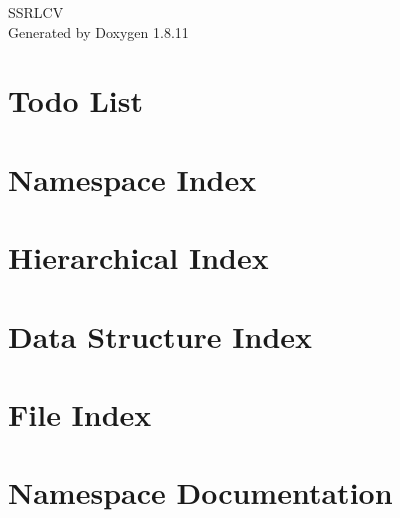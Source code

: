 \documentclass[twoside]{book}
\newcommand{\+}{\discretionary{\mbox{\scriptsize$\hookleftarrow$}}{}{}}
\newcommand{\clearemptydoublepage}{%
  \newpage{\pagestyle{empty}\cleardoublepage}%
}
\begin{document}
\hypersetup{pageanchor=false,
             bookmarksnumbered=true,
             pdfencoding=unicode
            }
\begin{titlepage}
\vspace*{7cm}
\begin{center}%
{\Large S\+S\+R\+L\+CV }\\
\vspace*{1cm}
{\large Generated by Doxygen 1.8.11}\\
\end{center}
\end{titlepage}
\clearemptydoublepage
\tableofcontents
\clearemptydoublepage
{}
\hypersetup{pageanchor=true}

\chapter{Todo List}
\label{todo}
\hypertarget{todo}{}

\chapter{Namespace Index}

\chapter{Hierarchical Index}

\chapter{Data Structure Index}

\chapter{File Index}

\chapter{Namespace Documentation}




\end{document}
